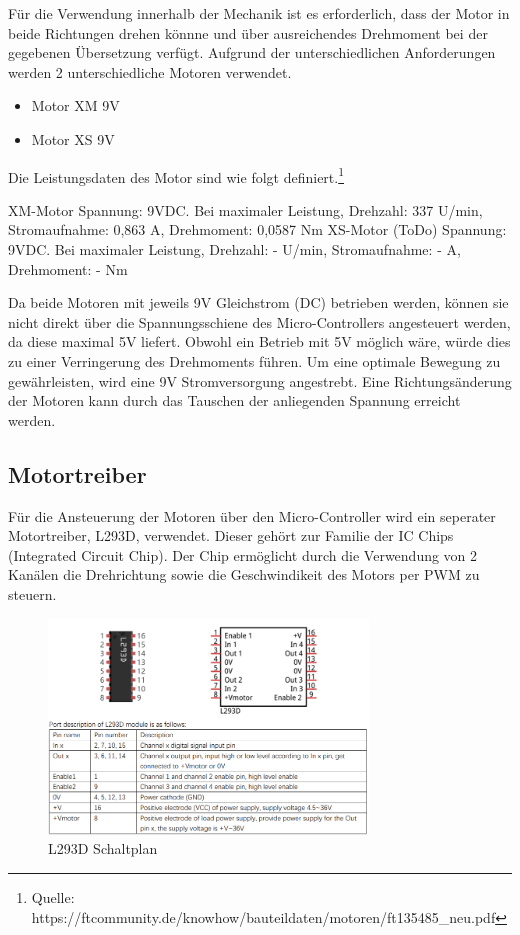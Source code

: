 \documentclass[conference,compsoc,final,a4paper]{IEEEtran}
\begin{document}
Für die Verwendung innerhalb der Mechanik ist es erforderlich, dass der Motor in beide Richtungen drehen könnne und über ausreichendes Drehmoment bei der gegebenen Übersetzung verfügt.
Aufgrund der unterschiedlichen Anforderungen werden 2 unterschiedliche Motoren verwendet.
\begin{itemize}
\item Motor XM 9V
\item Motor XS 9V
\end{itemize}

Die Leistungsdaten des Motor sind wie folgt definiert.\footnote{Quelle: https://ftcommunity.de/knowhow/bauteildaten/motoren/ft135485_neu.pdf}

XM-Motor
Spannung: 9VDC. Bei maximaler Leistung, Drehzahl: 337 U/min, Stromaufnahme: 0,863 A, Drehmoment: 0,0587 Nm
XS-Motor (ToDo)
Spannung: 9VDC. Bei maximaler Leistung, Drehzahl: - U/min, Stromaufnahme: - A, Drehmoment: - Nm

Da beide Motoren mit jeweils 9V Gleichstrom (DC) betrieben werden, können sie nicht direkt über die Spannungsschiene des Micro-Controllers angesteuert werden, 
da diese maximal 5V liefert. Obwohl ein Betrieb mit 5V möglich wäre, würde dies zu einer Verringerung des Drehmoments führen. Um eine optimale Bewegung zu gewährleisten, 
wird eine 9V Stromversorgung angestrebt.  Eine Richtungsänderung der Motoren kann durch das Tauschen der anliegenden Spannung erreicht werden.  

\subsection{Motortreiber}

Für die Ansteuerung der Motoren über den Micro-Controller wird ein seperater Motortreiber, L293D, verwendet.
Dieser gehört zur Familie der IC Chips (Integrated Circuit Chip). Der Chip ermöglicht durch die Verwendung von 2 Kanälen die Drehrichtung 
sowie die Geschwindikeit des Motors per PWM zu steuern.

\begin{figure}[h]
  \centering
\includegraphics[width=8.5cm]{../images/L293D.png}
\caption{L293D Schaltplan}
\label{Elektrik:L293D}
\end{figure}
\end{document}

